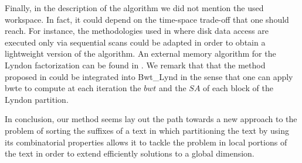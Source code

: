 \documentclass[envcountsame,runningheads]{llncs}
\begin{document}
Finally, in the description of the algorithm we did not mention the used workspace. In fact, it could depend on the time-space trade-off that one should reach. For instance, the methodologies used in \cite{BauerCoxRosoneTCS2013,FerraginaGagieManzini2012} where disk data access are executed only via sequential scans could be adapted in order to obtain a lightweight version of the algorithm. An external memory algorithm for the Lyndon factorization can be found in \cite{RohCrochemoreIliopoulosPark:2008}.
We remark that that the method proposed in \cite{FerraginaGagieManzini2012} could be integrated into {\sc Bwt\_Lynd} in the sense that one can apply {\sc bwte} to compute at each iteration the $bwt$ and the $SA$ of each block of the Lyndon partition.

In conclusion, our method seems lay out the path towards a new approach to the problem of sorting the suffixes of a text in which partitioning the text by using its combinatorial properties allows it to tackle the problem in local portions of the text in order to extend efficiently solutions to a global dimension.

          
\end{document}
